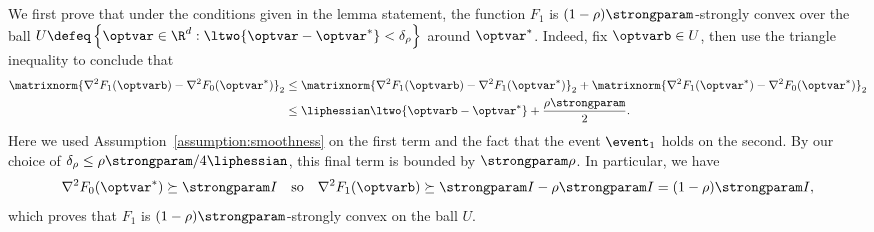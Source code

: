 \documentclass[11pt,twoside]{article}
\theoremstyle{definition}
\begin{document}
We first prove that under the conditions given in the lemma statement,
the function $F_1$ is $(1 - \rho) \strongparam$-strongly convex over
the ball $U \defeq \left\{\optvar \in \R^d : \ltwo{\optvar
- \optvar^*} <
\delta_\rho \right\}$ around $\optvar^*$. Indeed, fix $\optvarb \in U$,
then use the triangle inequality to conclude that
\begin{align*}
  \matrixnorm{\nabla^2 F_1(\optvarb) - \nabla^2 F_0(\optvar^*)}_2
  & \le \matrixnorm{\nabla^2 F_1(\optvarb) - \nabla^2
  F_1(\optvar^*)}_2 + \matrixnorm{\nabla^2 F_1(\optvar^*) - \nabla^2
  F_0(\optvar^*)}_2 \\ & \le \liphessian \ltwo{\optvarb - \optvar^*}
  + \frac{\rho \strongparam}{2}.
\end{align*}
Here we used Assumption~\ref{assumption:smoothness} on the first term
and the fact that the event $\event_1$ holds on the second.  By our
choice of $\delta_\rho \le \rho \strongparam / 4 \liphessian$, this
final term is bounded by $\strongparam \rho$. In particular, we have
\begin{equation*}
  \nabla^2 F_0(\optvar^*) \succeq \strongparam I ~~~ \mbox{so}
  ~~~ \nabla^2 F_1(\optvarb) \succeq \strongparam I
  - \rho \strongparam I = (1 - \rho) \strongparam I,
\end{equation*}
which proves that $F_1$ is $(1 - \rho) \strongparam$-strongly convex
on the ball $U$.
\end{document}
